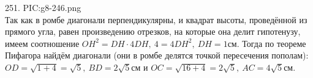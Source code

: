 251. {{PIC:g8-246.png}}\\
Так как в ромбе диагонали перпендикулярны, и квадрат высоты, проведённой из прямого угла, равен произведению отрезков, на которые она делит гипотенузу, имеем соотношение $OH^2=DH\cdot4DH,\ 4=4DH^2,\ DH=1$см. Тогда по теореме Пифагора найдём диагонали (они в ромбе делятся точкой пересечения пополам):
$OD=\sqrt{1+4}=\sqrt{5},\ BD=2\sqrt{5}$см и $OC=\sqrt{16+4}=2\sqrt{5},\ AC=4\sqrt{5}$см.\\
